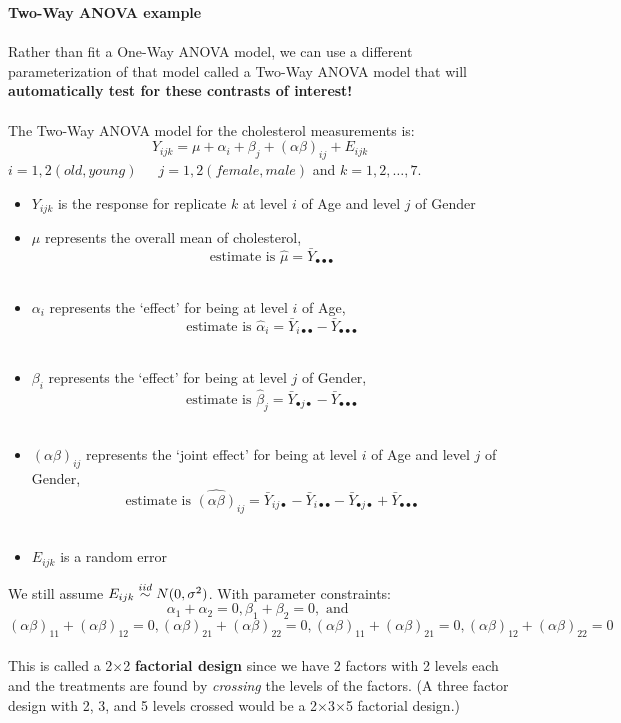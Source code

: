 \newpage
\textbf{Two-Way ANOVA example}\\~\\
Rather than fit a One-Way ANOVA model, we can use a different parameterization of that model called a Two-Way ANOVA model that will \textbf{automatically test for these contrasts of interest!}\\~\\
The Two-Way ANOVA model for the cholesterol measurements is:
$$Y_{ijk} = \mu + \alpha_i + \beta_j + (\alpha \beta)_{ij} + E_{ijk}$$
$i=1,2 (old,young)$~~~$j=1,2 (female, male)$ and $k=1,2,\ldots,7$.\\
\begin{itemize}
\item $Y_{ijk}$ is the response for replicate $k$ at level $i$ of Age and level $j$ of Gender
\item $\mu$ represents the overall mean of cholesterol, 
$$\mbox{estimate is }\hat{\mu}=\bar{Y}_{\bullet\bullet\bullet}$$\\
\item $\alpha_i$ represents the `effect' for being at level $i$ of Age, 
$$\mbox{estimate is }\hat{\alpha}_i=\bar{Y}_{i\bullet\bullet}-\bar{Y}_{\bullet\bullet\bullet}$$\\
\item $\beta_i$ represents the `effect' for being at level $j$ of Gender, 
$$\mbox{estimate is }\hat{\beta}_j=\bar{Y}_{\bullet j\bullet}-\bar{Y}_{\bullet\bullet\bullet}$$\\
\item $(\alpha\beta)_{ij}$ represents the `joint effect' for being at level $i$ of Age and level $j$ of Gender, 
$$\mbox{estimate is }\hat{(\alpha\beta)}_{ij}=\bar{Y}_{ij\bullet}-\bar{Y}_{i\bullet\bullet}-\bar{Y}_{\bullet j\bullet}+\bar{Y}_{\bullet\bullet\bullet}$$\\
\item $E_{ijk}$ is a random error\\
\end{itemize}
We still assume $E_{ijk} \stackrel{iid}{\sim} N(0,\sigma^2)$.  With parameter constraints:
$$\alpha_1+\alpha_2=0, \beta_1+\beta_2=0,\mbox{ and }$$
$$(\alpha\beta)_{11}+(\alpha\beta)_{12}=0,(\alpha\beta)_{21}+(\alpha\beta)_{22}=0,(\alpha\beta)_{11}+(\alpha\beta)_{21}=0,(\alpha\beta)_{12}+(\alpha\beta)_{22}=0$$~\\
This is called a 2$\times$2 \textbf{factorial design} since we have 2 factors with 2 levels each and the treatments are found by \textit{crossing} the levels of the factors.  (A three factor design with 2, 3, and 5 levels crossed would be a 2$\times$3$\times$5 factorial design.)

